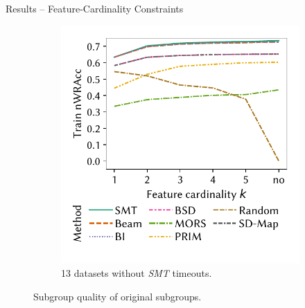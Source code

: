 \documentclass[en, navbaroff]{sdqbeamer}
\begin{document}
\begin{frame}[t]{Results -- Feature-Cardinality Constraints}
\begin{figure}
\begin{subfigure}[t]{0.35\textwidth}
			\centering
			\includegraphics[width=\textwidth, trim=10 25 10 10, clip]{plots/csd-cardinality-train-nwracc-no-timeout-datasets.pdf}
			\caption{13 datasets without \emph{SMT} timeouts.}
			\label{fig:csd:cardinality-train-nwracc-no-timeout-datasets}
		\end{subfigure}
		\caption*{
			Subgroup quality of original subgroups.
		}
		\label{fig:csd:cardinality:main}
	\end{figure}
\end{frame}
\end{document}

